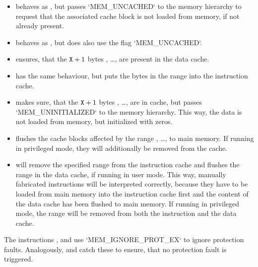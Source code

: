 \begin{itemize}
	\item {} behaves as , but passes `MEM_UNCACHED` to the memory hierarchy to request that the associated cache block is not loaded from memory, if not already present.
	\item {} behaves as , but does also use the flag `MEM_UNCACHED`.
	\item {} ensures, that the ${\tt X}+1$ bytes , \dots,  are present in the data cache.
	\item {} has the same behaviour, but puts the bytes in the range into the instruction cache.
	\item {} makes sure, that the ${\tt X}+1$ bytes , \dots,  are in cache, but passes `MEM_UNINITIALIZED` to the memory hierarchy. This way, the data is not loaded from memory, but initialized with zeros.
	\item {} flushes the cache blocks affected by the range , \dots,  to main memory. If running in privileged mode, they will additionally be removed from the cache.
	\item {} will remove the specified range from the instruction cache and flushes the range in the data cache, if running in user mode. This way, manually fabricated instructions will be interpreted correctly, because they have to be loaded from main memory into the instruction cache first and the content of the data cache has been flushed to main memory. If running in privileged mode, the range will be removed from both the instruction and the data cache.
\end{itemize}
The instructions ,  and  use `MEM_IGNORE_PROT_EX` to ignore protection faults. Analogously,  and  catch these  to ensure, that no protection fault is triggered.

